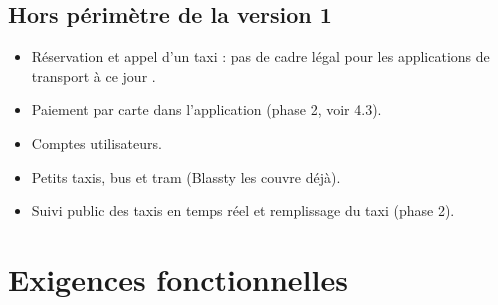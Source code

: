 \documentclass[11pt,a4paper]{article}
\begin{document}
\subsection{Hors périmètre de la version 1}
\begin{itemize}
\item Réservation et appel d'un taxi : pas de cadre légal pour les applications de transport à ce jour \cite{mwnuber}.
\item Paiement par carte dans l'application (phase 2, voir 4.3).
\item Comptes utilisateurs.
\item Petits taxis, bus et tram (Blassty les couvre déjà).
\item Suivi public des taxis en temps réel et remplissage du taxi (phase 2).
\end{itemize}

\section{Exigences fonctionnelles}
\end{document}
